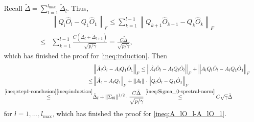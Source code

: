 \documentclass[11pt]{article}
\newcommand{\0}{{\mathbf{0}}}
\newcommand{\1}{{\mathbf{1}}}
\begin{document}
\begin{enumerate}[leftmargin=*]
	Recall $\tilde{\Delta} = \sum_{l=1}^{l_{\max}} \tilde{\Delta}_l$. Thus, 
	\begin{equation*}
	\begin{split}
	& \left\|Q_{l} \hat{O}_{l}  - Q_1 \hat{O}_1 \right\|_F  \leq \sum_{k=1}^{l-1}\left\|Q_{k+1}\hat{O}_{k+1} - Q_k\hat{O}_k\right\|_F \\
	\leq & \sum_{k=1}^{l-1} \frac{C(\tilde{\Delta}_l+\tilde{\Delta}_{l+1})}{\sqrt{p/\gamma}}= \frac{C\tilde{\Delta}}{\sqrt{p/\gamma}},
	\end{split}
	\end{equation*}
	which has finished the proof for \eqref{ineq:induction}. Then
	\begin{equation}
	\begin{split}
	& \left\|\hat{A}_l\hat{O}_l - A_l Q_1\hat{O}_1\right\|_F \leq \left\|\hat{A}_l\hat{O}_l - A_l Q_l\hat{O}_l\right\|_F + \left\|A_l Q_l\hat{O}_l - A_l Q_1\hat{O}_1\right\|_F\\
	\leq & \left\|\hat{A}_l - A_l Q_l \right\|_F + \left\|A_l\right\|\cdot \left\|Q_l\hat{O}_l - Q_1\hat{O}_1\right\|_F\\
	\overset{\eqref{ineq:step1-conclusion}\eqref{ineq:induction}}{\leq} & \tilde{\Delta}_l +   \|\Sigma_{0l}\|^{1/2} \cdot\frac{C\tilde\Delta}{\sqrt{p/\gamma}} \overset{\eqref{ineq:Sigma_0-spectral-norm}}{\leq} C\sqrt{\gamma}\tilde{\Delta}
	\end{split}
	\end{equation}
	for $l=1,\ldots, l_{\max}$, which has finished the proof for \eqref{ineq:A_lO_l-A_lO_1}.
	

\end{enumerate}
\end{document}
